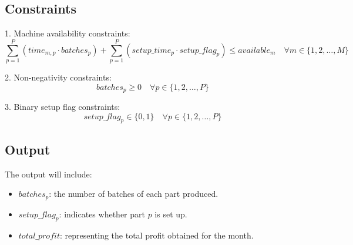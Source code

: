 \documentclass{article}
\begin{document}
\subsection*{Constraints}
1. Machine availability constraints:
\[
\sum_{p=1}^{P} (time_{m,p} \cdot batches_{p}) + \sum_{p=1}^{P} (setup\_time_{p} \cdot setup\_flag_{p}) \leq available_{m} \quad \forall m \in \{1, 2, \ldots, M\}
\]

2. Non-negativity constraints:
\[
batches_{p} \geq 0 \quad \forall p \in \{1, 2, \ldots, P\}
\]

3. Binary setup flag constraints:
\[
setup\_flag_{p} \in \{0, 1\} \quad \forall p \in \{1, 2, \ldots, P\}
\]

\subsection*{Output}
The output will include:
\begin{itemize}
    \item \( batches_{p} \): the number of batches of each part produced.
    \item \( setup\_flag_{p} \): indicates whether part \( p \) is set up.
    \item \( total\_profit \): representing the total profit obtained for the month.
\end{itemize}
\end{document}
